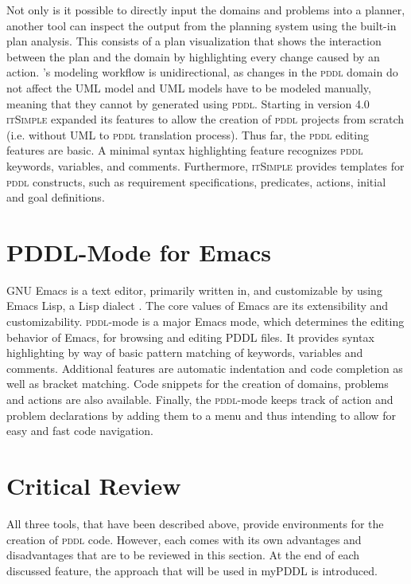 \documentclass[a4paper,12pt]{report}
\newcommand{\mypddl}{\smallerft[0.8]{myPDDL}\xspace}
\newcommand{\itsimple}{\textsc{itSimple}\xspace}
\newcommand{\pddlmode}{\textsc{pddl}-mode\xspace}
\newcommand{\pddl}{\textsc{pddl}\xspace}
\newcommand\smallerft[2][0.85]{{\scalefont{#1}#2}}
\begin{document}
Not only is it possible to directly input the domains and problems
into a planner, another tool can inspect the output from the planning
system using the built-in plan analysis. This consists of a plan
visualization that shows the interaction between the plan and the
domain by highlighting every change caused by an action. \itSimple's
modeling workflow is unidirectional, as changes in the \textsc{pddl} domain do
not affect the UML model and UML models have to be modeled manually,
meaning that they cannot by generated using \textsc{pddl}. Starting in version
4.0 \cite{vaquero2012itsimple4} \itsimple expanded its features to
allow the creation of \textsc{pddl} projects from scratch (i.e. without UML to
\textsc{pddl} translation process). Thus far, the \textsc{pddl} editing features are
basic. A minimal syntax highlighting feature recognizes \textsc{pddl} keywords,
variables, and comments. Furthermore, \itsimple provides templates for
\textsc{pddl} constructs, such as requirement specifications, predicates,
actions, initial and goal definitions.
\section{PDDL-Mode for Emacs}
\label{sec-3-3}

GNU Emacs is a text editor, primarily written in, and customizable by
using Emacs Lisp, a Lisp dialect
\cite{stallman1981emacs,lewis1990gnu}. The core values of Emacs are
its extensibility and customizability. \pddlmode \cite{pddlmode} is a
major Emacs mode, which determines the editing behavior of Emacs, for
browsing and editing \textsc{PDDL} files. It provides syntax
highlighting by way of basic pattern matching of keywords, variables
and comments. Additional features are automatic indentation and code
completion as well as bracket matching. Code snippets for the creation
of domains, problems and actions are also available. Finally, the
\pddlmode keeps track of action and problem declarations by adding
them to a menu and thus intending to allow for easy and fast code
navigation.
\section{Critical Review}
\label{sec-3-4}

All three tools, that have been described above, provide environments
for the creation of \pddl code. However, each comes with its own
advantages and disadvantages that are to be reviewed in this section.
At the end of each discussed feature, the approach that will be used
in \mypddl is introduced.
\end{document}
